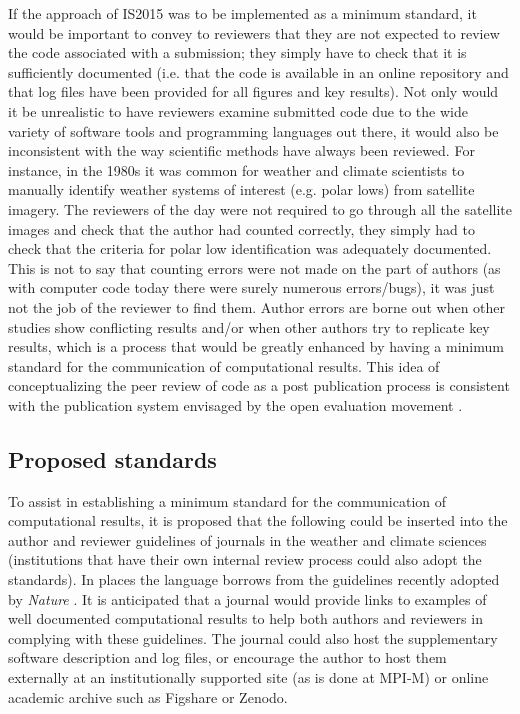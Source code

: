 If the approach of IS2015 was to be implemented as a minimum standard, it would be important to convey to reviewers that they are not expected to review the code associated with a submission; they simply have to check that it is sufficiently documented (i.e. that the code is available in an online repository and that log files have been provided for all figures and key results). Not only would it be unrealistic to have reviewers examine submitted code due to the wide variety of software tools and programming languages out there, it would also be inconsistent with the way scientific methods have always been reviewed. For instance, in the 1980s it was common for weather and climate scientists to manually identify weather systems of interest (e.g. polar lows) from satellite imagery. The reviewers of the day were not required to go through all the satellite images and check that the author had counted correctly, they simply had to check that the criteria for polar low identification was adequately documented. This is not to say that counting errors were not made on the part of authors (as with computer code today there were surely numerous errors/bugs), it was just not the job of the reviewer to find them. Author errors are borne out when other studies show conflicting results and/or when other authors try to replicate key results, which is a process that would be greatly enhanced by having a minimum standard for the communication of computational results. This idea of conceptualizing the peer review of code as a post publication process is consistent with the publication system envisaged by the open evaluation movement \citep[e.g.][]{Kriegeskorte2012}. 
  
\subsection{Proposed standards}

To assist in establishing a minimum standard for the communication of computational results, it is proposed that the following could be inserted into the author and reviewer guidelines of journals in the weather and climate sciences (institutions that have their own internal review process could also adopt the standards). In places the language borrows from the guidelines recently adopted by \textit{Nature} \citep{Nature2014}. It is anticipated that a journal would provide links to examples of well documented computational results to help both authors and reviewers in complying with these guidelines. The journal could also host the supplementary software description and log files, or encourage the author to host them externally at an institutionally supported site (as is done at MPI-M) or online academic archive such as Figshare or Zenodo.


